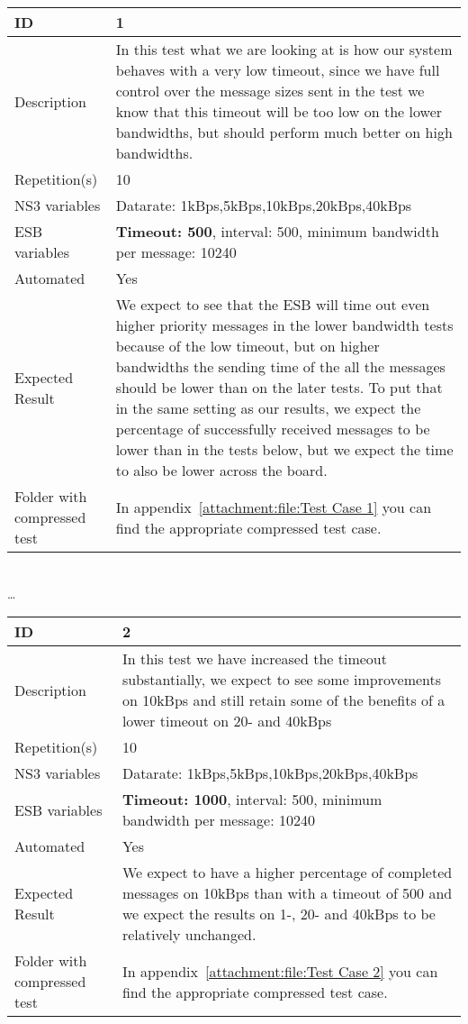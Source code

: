 \begin{center}

\begin{tabular}{| p{4cm} | p{8cm} |}%
	\hline
	ID & 1 \\
	\hline
	Description &  In this test what we are looking at is how our system behaves with a very low timeout, since we have full control over the message sizes sent in the test we know that this timeout will be too low on the lower bandwidths, but should perform much better on high bandwidths. \\
	\hline
	Repetition(s) & 10 \\
	\hline
	NS3 variables & Datarate: 1kBps,5kBps,10kBps,20kBps,40kBps \\
	\hline
	ESB variables & \textbf{Timeout: 500}, interval: 500, minimum bandwidth per message: 10240 \\
	\hline
	Automated & Yes \\
	\hline
	Expected Result & We expect to see that the ESB will time out even higher priority messages in the lower bandwidth tests because of the low timeout, but on higher bandwidths the sending time of the all the messages should be lower than on the later tests. To put that in the same setting as our results, we expect the percentage of successfully received messages to be lower than in the tests below, but we expect the time to also be lower across the board.  \\
	\hline
	Folder with compressed test & In appendix~\ref{attachment:file:Test Case 1} you can find the appropriate compressed test case.\\
	\hline
\end{tabular}

\\ \ldots \\

\begin{tabular}{| p{4cm} | p{8cm} |}%
	\hline
	ID & 2 \\
	\hline
	Description & In this test we have increased the timeout substantially, we expect to see some improvements on 10kBps and still retain some of the benefits of a lower timeout on 20- and 40kBps \\
	\hline
	Repetition(s) & 10 \\
	\hline
	NS3 variables & Datarate: 1kBps,5kBps,10kBps,20kBps,40kBps \\
	\hline
	ESB variables & \textbf{Timeout: 1000}, interval: 500, minimum bandwidth per message: 10240 \\
	\hline
	Automated & Yes \\
	\hline
	Expected Result & We expect to have a higher percentage of completed messages on 10kBps than with a timeout of 500 and we expect the results on 1-, 20- and 40kBps to be relatively unchanged. \\
	\hline
	Folder with compressed test & In appendix~\ref{attachment:file:Test Case 2} you can find the appropriate compressed test case.\\
	\hline
\end{tabular}


\end{center}
